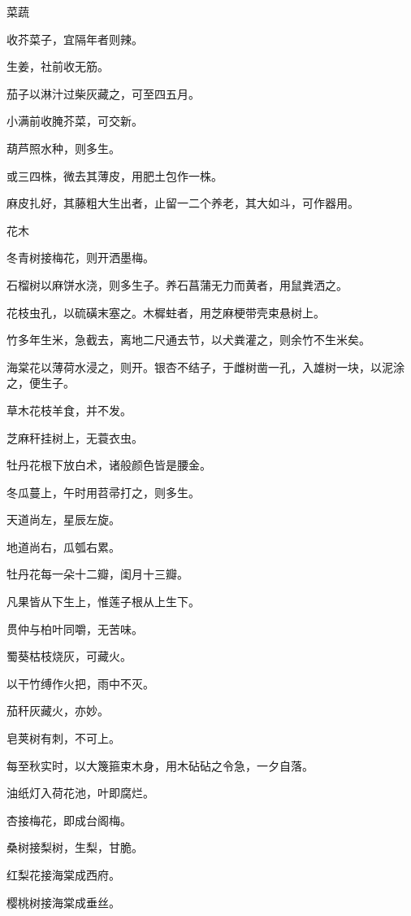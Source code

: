 \documentclass[a4paper,12pt,UTF8,twoside]{ctexbook}
\begin{document}
    菜蔬
    
    收芥菜子，宜隔年者则辣。
    
    生姜，社前收无筋。
    
    茄子以淋汁过柴灰藏之，可至四五月。
    
    小满前收腌芥菜，可交新。
    
    葫芦照水种，则多生。
    
    或三四株，微去其薄皮，用肥土包作一株。
    
    麻皮扎好，其藤粗大生出者，止留一二个养老，其大如斗，可作器用。
    
    花木
    
    冬青树接梅花，则开洒墨梅。
    
    石榴树以麻饼水浇，则多生子。养石菖蒲无力而黄者，用鼠粪洒之。
    
    花枝虫孔，以硫磺末塞之。木樨蛀者，用芝麻梗带壳束悬树上。
    
    竹多年生米，急截去，离地二尺通去节，以犬粪灌之，则余竹不生米矣。
    
    海棠花以薄荷水浸之，则开。银杏不结子，于雌树凿一孔，入雄树一块，以泥涂之，便生子。
    
    草木花枝羊食，并不发。
    
    芝麻秆挂树上，无蓑衣虫。
    
    牡丹花根下放白术，诸般颜色皆是腰金。
    
    冬瓜蔓上，午时用苕帚打之，则多生。
    
    天道尚左，星辰左旋。
    
    地道尚右，瓜瓠右累。
    
    牡丹花每一朵十二瓣，闺月十三瓣。
    
    凡果皆从下生上，惟莲子根从上生下。
    
    贯仲与柏叶同嚼，无苦味。
    
    蜀葵枯枝烧灰，可藏火。
    
    以干竹缚作火把，雨中不灭。
    
    茄秆灰藏火，亦妙。
    
    皂荚树有刺，不可上。
    
    每至秋实时，以大篾箍束木身，用木砧砧之令急，一夕自落。
    
    油纸灯入荷花池，叶即腐烂。
    
    杏接梅花，即成台阁梅。
    
    桑树接梨树，生梨，甘脆。
    
    红梨花接海棠成西府。
    
    樱桃树接海棠成垂丝。
    
\end{document}
